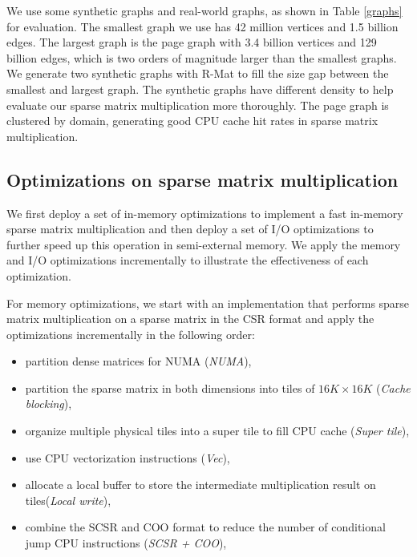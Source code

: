 We use some synthetic graphs and real-world graphs, as shown in Table \ref{graphs}
for evaluation. The smallest graph we use has 42 million vertices and 1.5 billion
edges. The largest graph is the page graph with 3.4 billion vertices
and 129 billion edges, which is two orders of magnitude larger than the smallest
graphs. We generate two synthetic graphs with R-Mat \cite{rmat} to fill
the size gap between the smallest and largest graph. The synthetic graphs
have different density to help evaluate our sparse matrix multiplication more
thoroughly. The page graph is clustered by domain, generating good CPU cache
hit rates in sparse matrix multiplication.

\subsection{Optimizations on sparse matrix multiplication}
We first deploy a set of in-memory optimizations to implement a fast
in-memory sparse matrix multiplication and then deploy a set of I/O
optimizations to further speed up this operation in semi-external memory.
We apply the memory and I/O optimizations incrementally to illustrate
the effectiveness of each optimization.

For memory optimizations, we start with an implementation that performs sparse
matrix multiplication on a sparse matrix in the CSR format and apply
the optimizations incrementally in the following order:
\begin{itemize} \itemsep1pt \parskip0pt 
		\item partition dense matrices for NUMA (\textit{NUMA}),
	\item partition the sparse matrix in both dimensions into tiles of
		$16K \times 16K$ (\textit{Cache blocking}),
	\item organize multiple physical tiles into a super tile to fill CPU cache
		(\textit{Super tile}),
	\item use CPU vectorization instructions (\textit{Vec}),
	\item allocate a local buffer to store the intermediate multiplication
		result on tiles(\textit{Local write}),
	\item combine the SCSR and COO format to reduce the number of conditional
		jump CPU instructions (\textit{SCSR + COO}),
\end{itemize}

